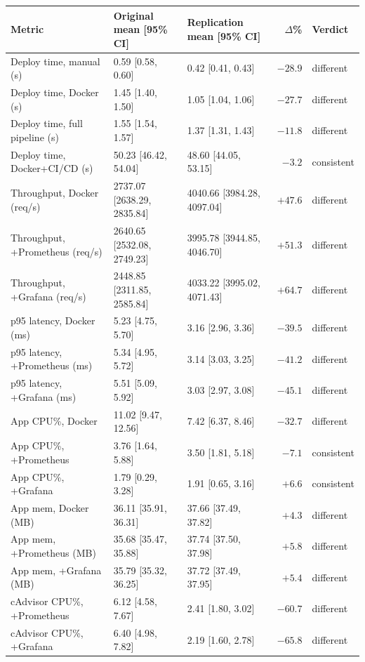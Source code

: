 \begin{tabular}{lllrl}
\toprule
Metric & Original mean [95\% CI] & Replication mean [95\% CI] & $\Delta$\% & Verdict \\
\midrule
Deploy time, manual (s) & 0.59 [0.58, 0.60] & 0.42 [0.41, 0.43] & $-28.9$ & different \\
Deploy time, Docker (s) & 1.45 [1.40, 1.50] & 1.05 [1.04, 1.06] & $-27.7$ & different \\
Deploy time, full pipeline (s) & 1.55 [1.54, 1.57] & 1.37 [1.31, 1.43] & $-11.8$ & different \\
Deploy time, Docker+CI/CD (s) & 50.23 [46.42, 54.04] & 48.60 [44.05, 53.15] & $-3.2$ & consistent \\
Throughput, Docker (req/s) & 2737.07 [2638.29, 2835.84] & 4040.66 [3984.28, 4097.04] & $+47.6$ & different \\
Throughput, +Prometheus (req/s) & 2640.65 [2532.08, 2749.23] & 3995.78 [3944.85, 4046.70] & $+51.3$ & different \\
Throughput, +Grafana (req/s) & 2448.85 [2311.85, 2585.84] & 4033.22 [3995.02, 4071.43] & $+64.7$ & different \\
p95 latency, Docker (ms) & 5.23 [4.75, 5.70] & 3.16 [2.96, 3.36] & $-39.5$ & different \\
p95 latency, +Prometheus (ms) & 5.34 [4.95, 5.72] & 3.14 [3.03, 3.25] & $-41.2$ & different \\
p95 latency, +Grafana (ms) & 5.51 [5.09, 5.92] & 3.03 [2.97, 3.08] & $-45.1$ & different \\
App CPU\%, Docker & 11.02 [9.47, 12.56] & 7.42 [6.37, 8.46] & $-32.7$ & different \\
App CPU\%, +Prometheus & 3.76 [1.64, 5.88] & 3.50 [1.81, 5.18] & $-7.1$ & consistent \\
App CPU\%, +Grafana & 1.79 [0.29, 3.28] & 1.91 [0.65, 3.16] & $+6.6$ & consistent \\
App mem, Docker (MB) & 36.11 [35.91, 36.31] & 37.66 [37.49, 37.82] & $+4.3$ & different \\
App mem, +Prometheus (MB) & 35.68 [35.47, 35.88] & 37.74 [37.50, 37.98] & $+5.8$ & different \\
App mem, +Grafana (MB) & 35.79 [35.32, 36.25] & 37.72 [37.49, 37.95] & $+5.4$ & different \\
cAdvisor CPU\%, +Prometheus & 6.12 [4.58, 7.67] & 2.41 [1.80, 3.02] & $-60.7$ & different \\
cAdvisor CPU\%, +Grafana & 6.40 [4.98, 7.82] & 2.19 [1.60, 2.78] & $-65.8$ & different \\

\end{tabular}
